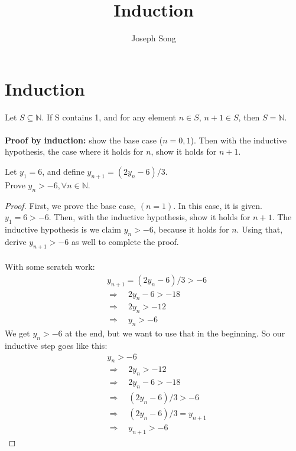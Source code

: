 \documentclass{article}
\title{Induction}
\author{Joseph Song}
\date{}
\begin{document}
\maketitle

\section{Induction}
Let $S \subseteq \mathbb{N}$. If S contains 1, and for any element $n \in S$, $n + 1 \in S$, then $S = \mathbb{N}$.
\\
\\
\textbf{Proof by induction:} show the base case ($n = 0, 1$). Then with the inductive hypothesis, the case where it holds for $n$, show it holds for $n + 1$. 

\begin{example}
Let $y_1 = 6$, and define $y_{n+1} = (2y_n-6)/3$.
\\
Prove $y_n > -6, \forall n \in \mathbb{N}$.
\end{example}
\begin{proof}
    First, we prove the base case, $(n=1)$. In this case, it is given. $y_1=6>-6$.
    Then, with the inductive hypothesis, show it holds for $n+1$.
    The inductive hypothesis is we claim $y_n > -6$, because it holds for $n$. Using that, derive $y_{n+1} > -6$ as well to complete the proof.
    \\
    \\
    With some scratch work: 
    \begin{align*}
         &y_{n+1} = (2y_n-6)/3 > -6 \\
         &\Rightarrow\quad 2y_n-6 > -18 \\
         &\Rightarrow\quad 2y_n > - 12 \\ 
         &\Rightarrow\quad y_n > -6
    \end{align*}
    We get $y_n > -6$ at the end, but we want to use that in the beginning. So our inductive step goes like this:
    \begin{align*}
       &y_n > - 6\\
       &\Rightarrow\quad 2y_n > -12 \\
       &\Rightarrow\quad 2y_n - 6 > -18 \\
       &\Rightarrow\quad (2y_n - 6)/3 > -6 \\
       &\Rightarrow\quad (2y_n - 6)/3 = y_{n+1} \\
       &\Rightarrow\quad y_{n+1} > -6
    \end{align*}
\end{proof}
\end{document}
